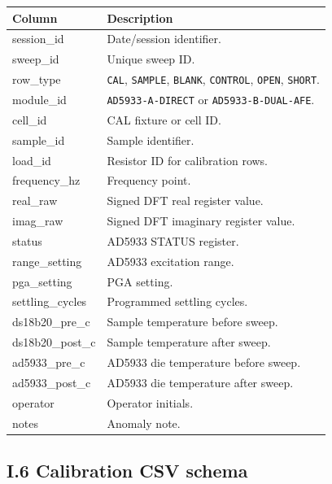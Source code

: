 \documentclass[11pt,a4paper]{article}
\begin{document}
\begin{xltabular}{\textwidth}{L{42mm}Y}
\toprule
\textbf{Column} & \textbf{Description}\\
\midrule
session\_id & Date/session identifier.\\
sweep\_id & Unique sweep ID.\\
row\_type & \texttt{CAL}, \texttt{SAMPLE}, \texttt{BLANK}, \texttt{CONTROL}, \texttt{OPEN}, \texttt{SHORT}.\\
module\_id & \texttt{AD5933-A-DIRECT} or \texttt{AD5933-B-DUAL-AFE}.\\
cell\_id & CAL fixture or cell ID.\\
sample\_id & Sample identifier.\\
load\_id & Resistor ID for calibration rows.\\
frequency\_hz & Frequency point.\\
real\_raw & Signed DFT real register value.\\
imag\_raw & Signed DFT imaginary register value.\\
status & AD5933 STATUS register.\\
range\_setting & AD5933 excitation range.\\
pga\_setting & PGA setting.\\
settling\_cycles & Programmed settling cycles.\\
ds18b20\_pre\_c & Sample temperature before sweep.\\
ds18b20\_post\_c & Sample temperature after sweep.\\
ad5933\_pre\_c & AD5933 die temperature before sweep.\\
ad5933\_post\_c & AD5933 die temperature after sweep.\\
operator & Operator initials.\\
notes & Anomaly note.\\
\bottomrule
\end{xltabular}

\subsection{I.6 Calibration CSV schema}
\end{document}

